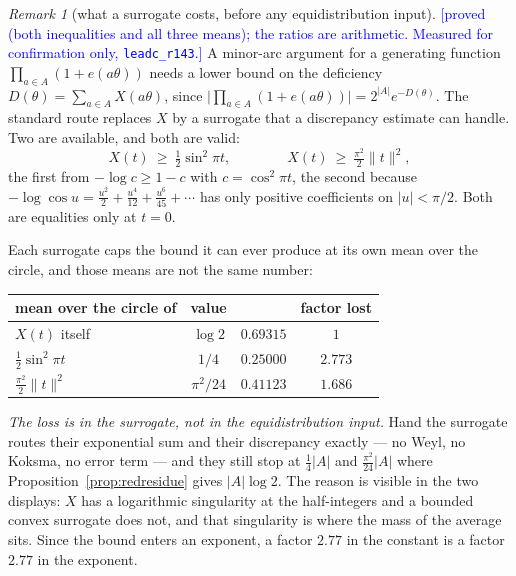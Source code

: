 \documentclass[11pt,a4paper]{article}
\theoremstyle{plain}
\theoremstyle{definition}
\theoremstyle{remark}
\newtheorem{remark}[theorem]{Remark}
\newcommand{\STATUS}[1]{\textcolor{blue}{\textsf{[#1]}}}
\begin{document}
\begin{remark}[what a surrogate costs, before any equidistribution input]\label{rem:surrogate}
\STATUS{proved (both inequalities and all three means); the ratios are arithmetic.
Measured for confirmation only, \texttt{leadc\_r143}.}
A minor-arc argument for a generating function $\prod_{a\in A}(1+e(a\theta))$ needs a lower bound
on the deficiency $D(\theta)=\sum_{a\in A}X(a\theta)$, since
$\bigl|\prod_{a\in A}(1+e(a\theta))\bigr|=2^{|A|}e^{-D(\theta)}$. The standard route replaces $X$
by a surrogate that a discrepancy estimate can handle. Two are available, and both are valid:
\[
  X(t)\ \ge\ \tfrac12\sin^{2}\pi t,\qquad\qquad X(t)\ \ge\ \tfrac{\pi^{2}}{2}\|t\|^{2},
\]
the first from $-\log c\ge1-c$ with $c=\cos^{2}\pi t$, the second because
$-\log\cos u=\tfrac{u^{2}}{2}+\tfrac{u^{4}}{12}+\tfrac{u^{6}}{45}+\cdots$ has only positive
coefficients on $|u|<\pi/2$. Both are equalities only at $t=0$.

Each surrogate caps the bound it can ever produce at its own mean over the circle, and those
means are not the same number:
\begin{center}
\begin{tabular}{lccc}
\toprule
mean over the circle of & value & & factor lost\\
\midrule
$X(t)$ itself & $\log2$ & $0.69315$ & $1$\\
$\tfrac12\sin^{2}\pi t$ & $1/4$ & $0.25000$ & $2.773$\\
$\tfrac{\pi^{2}}{2}\|t\|^{2}$ & $\pi^{2}/24$ & $0.41123$ & $1.686$\\
\bottomrule
\end{tabular}
\end{center}
\noindent
\emph{The loss is in the surrogate, not in the equidistribution input.} Hand the surrogate routes
their exponential sum and their discrepancy exactly --- no Weyl, no Koksma, no error term --- and
they still stop at $\tfrac14|A|$ and $\tfrac{\pi^{2}}{24}|A|$ where
Proposition~\ref{prop:redresidue} gives $|A|\log2$. The reason is visible in the two displays:
$X$ has a logarithmic singularity at the half-integers and a bounded convex surrogate does not,
and that singularity is where the mass of the average sits. Since the bound enters an exponent,
a factor $2.77$ in the constant is a factor $2.77$ in the exponent.
\end{remark}
\end{document}
